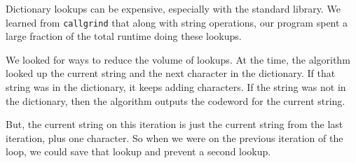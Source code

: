 \documentclass[12pt,twoside]{reedthesis}
\begin{document}
Dictionary lookups can be expensive, especially with the standard library. We learned from \texttt{callgrind} that along with string operations, our program spent a large fraction of the total runtime doing these lookups.

We looked for ways to reduce the volume of lookups. At the time, the algorithm looked up the current string and the next character in the dictionary. If that string was in the dictionary, it keeps adding characters. If the string was not in the dictionary, then the algorithm outputs the codeword for the current string.

But, the current string on this iteration is just the current string from the last iteration, plus one character. So when we were on the previous iteration of the loop, we could save that lookup and prevent a second lookup.
\end{document}
